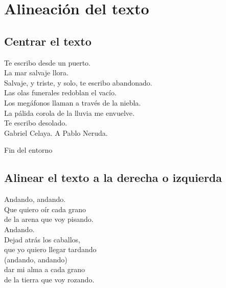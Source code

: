 \documentclass[11pt,a4paper]{report}
\begin{document}
\chapter{Alineación del texto}\label{cap.ali}




\section{Centrar el texto}



\begin{center}
Te escribo desde un puerto.  \\
La mar salvaje llora.       \\ 
Salvaje, y triste, y solo, te escribo abandonado.\\  
Las olas funerales redoblan el vacío.    \\
Los megáfonos llaman a través de la niebla.   \\
La pálida corola de la lluvia me envuelve.      \\
Te escribo desolado.     \\
Gabriel Celaya. A Pablo Neruda. 
\end{center}

Fin del entorno 


\section{Alinear el texto a la derecha o izquierda}

\begin{flushright}
Andando, andando. \\
Que quiero oír cada grano \\
de la arena que voy pisando. \\

Andando. \\
Dejad atrás los caballos, \\
que yo quiero llegar tardando \\
(andando, andando)  \\
dar mi alma a cada grano \\
de la tierra que voy rozando.\\
\end{flushright}
\end{document}
